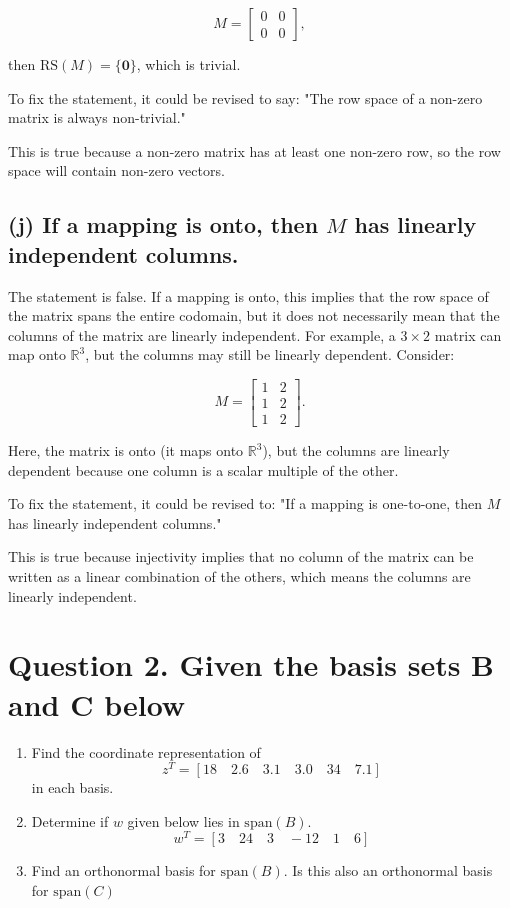 \documentclass{article}
\begin{document}
\[
M = \begin{bmatrix} 
0 & 0 \\
0 & 0
\end{bmatrix},
\]

then \( \text{RS}(M) = \{ \mathbf{0} \} \), which is trivial.

To fix the statement, it could be revised to say:
"The row space of a non-zero matrix is always non-trivial."

This is true because a non-zero matrix has at least one non-zero row, so the row space will contain non-zero vectors.

\subsection*{(j) If a mapping is onto, then \( M \) has linearly independent columns.}

The statement is false. If a mapping is onto, this implies that the row space of the matrix spans the entire codomain, but it does not necessarily mean that the columns of the matrix are linearly independent. For example, a \( 3 \times 2 \) matrix can map onto \( \mathbb{R}^3 \), but the columns may still be linearly dependent. Consider:

\[
M = \begin{bmatrix} 
1 & 2 \\
1 & 2 \\
1 & 2
\end{bmatrix}.
\]

Here, the matrix is onto (it maps onto \( \mathbb{R}^3 \)), but the columns are linearly dependent because one column is a scalar multiple of the other.

To fix the statement, it could be revised to:
"If a mapping is one-to-one, then \( M \) has linearly independent columns."

This is true because injectivity implies that no column of the matrix can be written as a linear combination of the others, which means the columns are linearly independent.

\section*{Question 2. Given the basis sets B and C below}

\begin{enumerate}[label={\alph*.}]
    \item Find the coordinate representation of 
    \[
    z^T = [18 \quad 2.6 \quad 3.1 \quad 3.0 \quad 34 \quad 7.1]
    \]
    in each basis.
    \item Determine if \( w \) given below lies in \( \text{span}(B) \).
    \[
    w^T = [3 \quad 24 \quad 3 \quad -12 \quad 1 \quad 6]
    \]
    \item Find an orthonormal basis for \( \text{span}(B) \). Is this also an orthonormal basis for \( \text{span}(C) \)
\end{enumerate}
\end{document}
